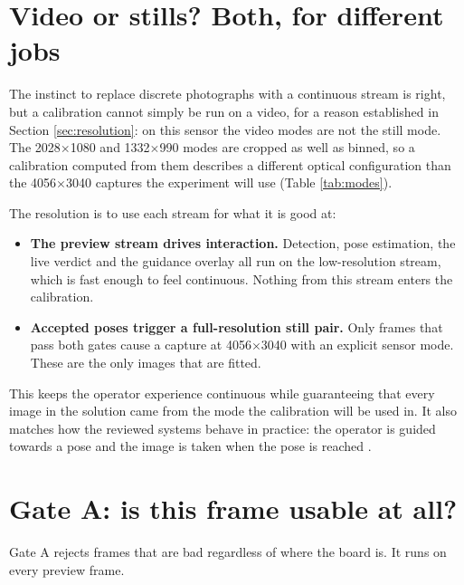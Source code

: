 \section{Video or stills? Both, for different jobs}

The instinct to replace discrete photographs with a continuous stream is right, but a calibration cannot simply be run on a video, for a reason established in Section \ref{sec:resolution}: on this sensor the video modes are not the still mode. The 2028$\times$1080 and 1332$\times$990 modes are cropped as well as binned, so a calibration computed from them describes a different optical configuration than the 4056$\times$3040 captures the experiment will use (Table \ref{tab:modes}).

The resolution is to use each stream for what it is good at:

\begin{itemize}
    \item \textbf{The preview stream drives interaction.} Detection, pose estimation, the live verdict and the guidance overlay all run on the low-resolution stream, which is fast enough to feel continuous. Nothing from this stream enters the calibration.
    \item \textbf{Accepted poses trigger a full-resolution still pair.} Only frames that pass both gates cause a capture at 4056$\times$3040 with an explicit sensor mode. These are the only images that are fitted.
\end{itemize}

This keeps the operator experience continuous while guaranteeing that every image in the solution came from the mode the calibration will be used in. It also matches how the reviewed systems behave in practice: the operator is guided towards a pose and the image is taken when the pose is reached \cite{peng2019wizard,rojtberg2018pose}.

\section{Gate A: is this frame usable at all?}

Gate A rejects frames that are bad regardless of where the board is. It runs on every preview frame.

